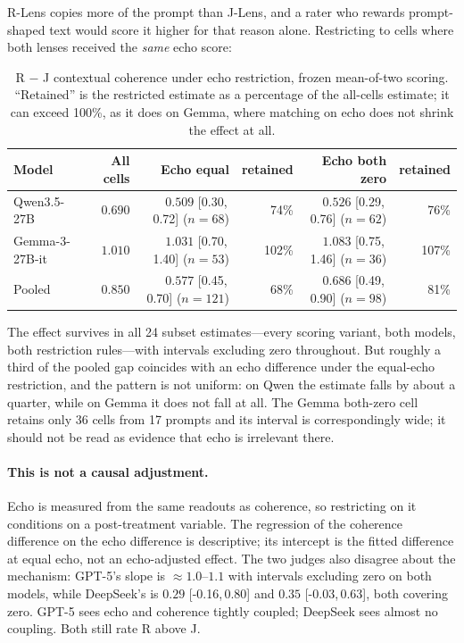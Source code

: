 \documentclass[11pt]{article}
\newcommand{\ci}[2]{[#1,\,#2]}
\newcommand{\flag}[1]{\textcolor{flagged}{#1}}
\begin{document}
R-Lens copies more of the prompt than J-Lens, and a rater who rewards
prompt-shaped text would score it higher for that reason alone. Restricting to
cells where both lenses received the \emph{same} echo score:

\begin{table}[h]
\centering
\small
\setlength{\tabcolsep}{4pt}
\begin{tabular}{lrrrrr}
\toprule
Model & All cells & Echo equal & retained & Echo both zero & retained \\
\midrule
Qwen3.5-27B    & $0.690$ & $0.509$ \ci{0.30}{0.72} ($n{=}68$) & 74\% & $0.526$ \ci{0.29}{0.76} ($n{=}62$) & 76\% \\
Gemma-3-27B-it & $1.010$ & $1.031$ \ci{0.70}{1.40} ($n{=}53$) & 102\% & $1.083$ \ci{0.75}{1.46} ($n{=}36$) & 107\% \\
Pooled         & $0.850$ & $0.577$ \ci{0.45}{0.70} ($n{=}121$) & 68\% & $0.686$ \ci{0.49}{0.90} ($n{=}98$) & 81\% \\
\bottomrule
\end{tabular}
\caption{R $-$ J contextual coherence under echo restriction, frozen
mean-of-two scoring. ``Retained'' is the restricted estimate as a percentage
of the all-cells estimate; it can exceed 100\%, as it does on Gemma, where
matching on echo does not shrink the effect at all.}
\label{tab:echo}
\end{table}

The effect survives in all 24 subset estimates---every scoring variant, both
models, both restriction rules---with intervals excluding zero throughout.
\flag{But roughly a third of the pooled gap coincides with an echo difference}
under the equal-echo restriction, and the pattern is not uniform: on Qwen the
estimate falls by about a quarter, while on Gemma it does not fall at all.
The Gemma both-zero cell retains only 36 cells from 17 prompts and its interval
is correspondingly wide; it should not be read as evidence that echo is
irrelevant there.

\paragraph{This is not a causal adjustment.} Echo is measured from the same
readouts as coherence, so restricting on it conditions on a post-treatment
variable. The regression of the coherence difference on the echo difference is
descriptive; its intercept is the fitted difference at equal echo, not an
echo-adjusted effect. \flag{The two judges also disagree about the mechanism}:
GPT-5's slope is $\approx 1.0$--$1.1$ with intervals excluding zero on both
models, while DeepSeek's is $0.29$ \ci{-0.16}{0.80} and $0.35$
\ci{-0.03}{0.63}, both covering zero. GPT-5 sees echo and coherence tightly
coupled; DeepSeek sees almost no coupling. Both still rate R above J.
\end{document}
